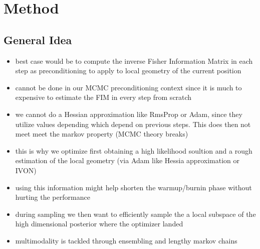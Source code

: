\section{Method}\label{sec:method}
\subsection{General Idea}\label{sec:general_idea}

\begin{itemize}
    \item best case would be to compute the inverse Fisher Information Matrix in each step as preconditioning to apply to local geometry of the current position
    \item cannot be done in our MCMC preconditioning context since it is much to expensive to estimate the FIM in every step from scratch
    \item we cannot do a Hessian approximation like RmsProp or Adam, since they utilize values depending which depend on previous steps. This does then not meet meet the markov property (MCMC theory breaks)
    \item this is why we optimize first obtaining a high likelihood soultion and a rough estimation of the local geometry (via Adam like Hessia approximation or IVON)
    \item using this information might help shorten the warmup/burnin phase without hurting the performance
    \item during sampling we then want to efficiently sample the a local subspace of the high dimensional posterior where the optimizer landed
    \item multimodality is tackled through ensembling and lengthy markov chains
\end{itemize}

\newpage
